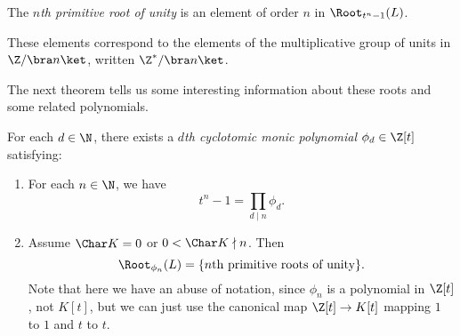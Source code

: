 \documentclass[a4paper]{article}
\begin{document}
\begin{defi}
  The \emph{$n$th primitive root of unity} is an element of order $n$ in $\Root_{t^n - 1}(L)$.
\end{defi}
These elements correspond to the elements of the multiplicative group of units in $\Z/\bra n\ket$, written $\Z^*/\bra n\ket$.

The next theorem tells us some interesting information about these roots and some related polynomials.

\begin{thm}
  For each $d \in \N$, there exists a \emph{$d$th cyclotomic monic polynomial} $\phi_d \in \Z[t]$ satisfying:
  \begin{enumerate}
    \item For each $n \in \N$, we have
      \[
        t^n - 1 = \prod_{d \mid n} \phi_d.
      \]
    \item Assume $\Char K = 0$ or $0 < \Char K \nmid n$. Then
      \[
        \Root_{\phi_n}(L) = \{n\text{th primitive roots of unity}\}.
      \]
      Note that here we have an abuse of notation, since $\phi_n$ is a polynomial in $\Z[t]$, not $K[t]$, but we can just use the canonical map $\Z[t] \to K[t]$ mapping $1$ to $1$ and $t$ to $t$.
  \end{enumerate}
\end{thm}
\end{document}
